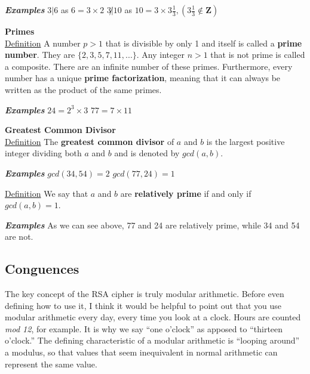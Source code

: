 \documentclass{article}
\begin{document}
            \textbf{\textit{Examples}}
            \hspace*{\fill}    
                 {$3|6$ as $6=3\times2$} \hfill {$3\not|10$ as $10=3\times3\frac{1}{3},(3\frac{1}{3}\not\in\mathbf{Z})$}
            \hspace*{\fill}
            
            \noindent\textbf{Primes}\\
            \underline{Definition} A number $p>1$ that is divisible by only 1 and itself is called a \textbf{prime number}.  They are $\{2,3,5,7,11,...\}$.  Any integer $n>1$ that is not prime is called a composite.  There are an infinite number of these primes.  
            Furthermore, every number has a unique \textbf{prime factorization}, meaning that it can always be written as the product of the same primes.
            
            \textbf{\textit{Examples}}
            \hspace*{\fill}
	            {$24=2^{3}\times3$} \hfill {$77=7\times11 $}
            \hspace*{\fill}
            
            \noindent\textbf{Greatest Common Divisor}\\
            \underline{Definition} The \textbf{greatest common divisor} of $a$ and $b$ is the largest positive integer dividing both $a$ and $b$ and is denoted by $gcd(a,b)$.
            
            \textbf{\textit{Examples}}
            \hspace*{\fill}
	            {$gcd(34,54)=2$} \hfill {$gcd(77,24)=1$}
            \hspace*{\fill}
            
            \noindent\underline{Definition} We say that $a$ and $b$ are \textbf{relatively prime} if and only if $gcd(a,b)=1$.
            
            \textbf{\textit{Examples}} As we can see above, 77 and 24 are relatively prime, while 34 and 54 are not.
        \subsection{Conguences}
	        The key concept of the RSA cipher is truly modular arithmetic.  
	        Before even defining how to use it, I think it would be helpful to point out that you use modular arithmetic every day, every time you look at a clock.
	        Hours are counted \textit{mod 12}, for example.  
	        It is why we say ``one o'clock'' as apposed to ``thirteen o'clock.''
	        The defining characteristic of a modular arithmetic is ``looping around'' a modulus, so that values that seem inequivalent in normal arithmetic can represent the same value.
	        
\end{document}
